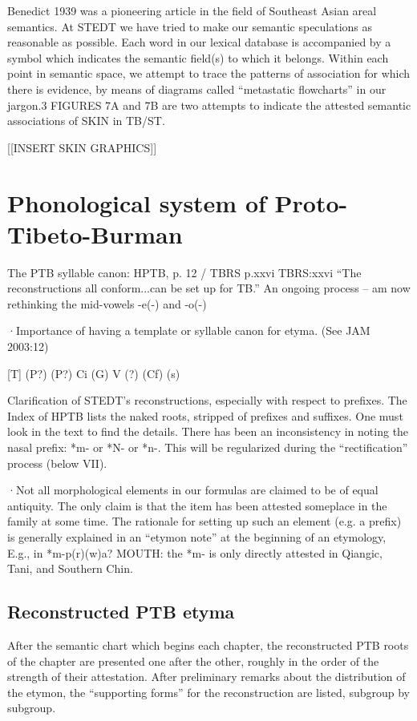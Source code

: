 Benedict 1939 was a pioneering article in the field of Southeast Asian areal semantics. At STEDT we have tried to make our semantic speculations as reasonable as possible. Each word in our lexical database is accompanied by a symbol which indicates the semantic field(s) to which it belongs. Within each point in semantic space, we attempt to trace the patterns of association for which there is evidence, by means of diagrams called “metastatic flowcharts” in our jargon.3 FIGURES 7A and 7B are two attempts to indicate the attested semantic associations of SKIN in TB/ST.

[[INSERT SKIN GRAPHICS]]

\section{Phonological system of Proto-Tibeto-Burman}

	The PTB syllable canon: HPTB, p. 12 / TBRS p.xxvi
	TBRS:xxvi “The reconstructions all conform...can be set up for TB.”
	An ongoing process -- am now rethinking the mid-vowels -e(-) and -o(-)

·Importance of having a template or syllable canon for etyma. (See JAM 2003:12)
		
					[T]
	(P?)	(P?)	Ci	(G)	V	(?)	(Cf)	(s)
	
Clarification of STEDT’s reconstructions, especially with respect to prefixes.
The Index of HPTB lists the naked roots, stripped of prefixes and suffixes. One must look in the text to find the details. There has been an inconsistency in noting the nasal prefix:  *m- or *N- or *n-. This will be regularized during the “rectification” process (below VII).

·Not all morphological elements in our formulas are claimed to be of equal antiquity. The only claim is that the item has been attested someplace in the family at some time.  The rationale for setting up such an element (e.g. a prefix) is generally explained in an “etymon note” at the beginning of an etymology, E.g., in *m-p(r)(w)a? MOUTH: the *m- is only directly attested in Qiangic, Tani, and Southern Chin.


\subsection{Reconstructed PTB etyma}


After the semantic chart which begins each chapter, the reconstructed PTB
roots of the chapter are presented one after the other, roughly in the order of
the strength of their attestation.  After preliminary remarks about the
distribution of the etymon, the “supporting forms” for the reconstruction are
listed, subgroup by subgroup.


